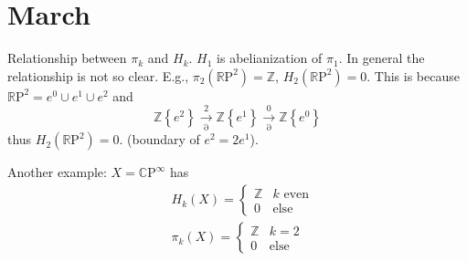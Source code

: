 \documentclass{report}
\begin{document}
\chapter{March}
\begin{tocbox}
	\minitoc
\end{tocbox}

Relationship between $ \pi_k $ and $ H_k $. $ H_1 $ is abelianization of $ \pi_1
$. In general the relationship is not so clear. E.g., $ \pi_2(\mathbb{R}\text{P}^2) 
= \mathbb{Z}$, $ H_2(\mathbb{R}\text{P}^2) = 0$. This is because
$\mathbb{R}\text{P}^2 = e^0\cup e^1 \cup e^2$ and 
\begin{equation*}
	\mathbb{Z}\left\{e^2 \right\} \xrightarrow[\partial]{2}
		\mathbb{Z}\left\{ e^1 \right\}\xrightarrow[\partial]{0} 
		\mathbb{Z}\left\{e^0\right\}
\end{equation*}
thus $ H_2(\mathbb{R}\text{P}^2)=0 $. (boundary of $ e^2 = 2e^1$).

Another example: $ X = \mathbb{C}\text{P}^\infty $ has 
\begin{align*}
	&H_k(X) = 
	\begin{cases}
	\mathbb{Z} & k\text{ even}\\
	0 & \text{else}
	\end{cases}\\
	&\pi_k(X) = \begin{cases}
	\mathbb{Z} & k=2\\
	0 & \text{else}
	\end{cases}
\end{align*}
\end{document}
